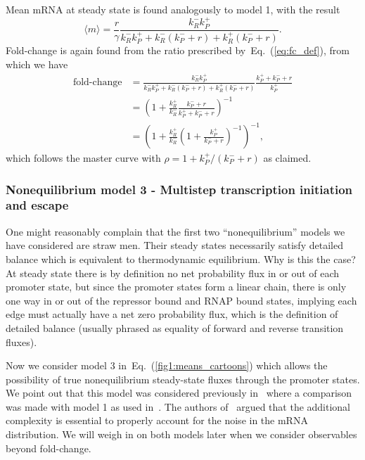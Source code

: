 \documentclass[12pt]{article}%
\newcommand{\eq}[1]{Eq.~(\ref{#1})}
\begin{document}
Mean mRNA at steady state is found analogously to model 1, with the result
\begin{equation}
\langle m\rangle = \frac{r}{\gamma}
        \frac{k_R^- k_P^+}
        {k_R^- k_P^+ + k_R^- (k_P^- + r) + k_R^+ (k_P^- + r)}.
\end{equation}
Fold-change is again found from the ratio prescribed by~\eq{eq:fc_def},
from which we have
\begin{align}
\text{fold-change}
&=      \frac{k_R^- k_P^+}
        {k_R^- k_P^+ + k_R^- (k_P^- + r) + k_R^+ (k_P^- + r)}
        \frac{k_P^+ + k_P^- + r}{k_P^+}
\\
&=      \left(1 + \frac{k_R^+}{k_R^-}
                \frac{k_P^- + r}{k_P^+ + k_P^- + r}
        \right)^{-1}
\\
&=      \left(1 + \frac{k_R^+}{k_R^-}
        \left(1 + \frac{k_P^+}{k_P^- + r}\right)^{-1}
        \right)^{-1},
\end{align}
which follows the master curve with
$\rho = 1 + k_P^+/(k_P^- + r)$ as claimed.

\subsubsection{Nonequilibrium model 3
- Multistep transcription initiation and escape}
One might reasonably complain that the first two
``nonequilibrium'' models we have considered are straw men. Their
steady states necessarily satisfy detailed balance which is
equivalent to thermodynamic equilibrium. Why is this the case? At
steady state there is by definition no net probability flux in or
out of each promoter state, but since the promoter states form a
linear chain, there is only one way in or out of the repressor
bound and RNAP bound states, implying each edge must actually
have a net zero probability flux, which is the definition of
detailed balance (usually phrased as equality of forward and
reverse transition fluxes).

Now we consider model 3 in~\eq{fig1:means_cartoons} which allows
the possibility of true nonequilibrium steady-state fluxes
through the promoter states.
We point out that this model was considered previously in~\cite{Mitarai2015}
where a comparison was made with model 1 as used in~\cite{Jones2014}.
The authors of~\cite{Mitarai2015} argued that the additional
complexity is essential to properly account for the noise in the
mRNA distribution. We will weigh in on both models later when we
consider observables beyond fold-change.
\end{document}

